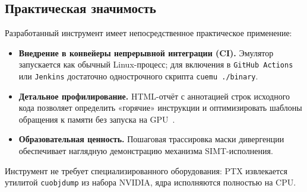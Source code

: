 \subsection{Практическая значимость}

Разработанный инструмент имеет непосредственное практическое применение:

\begin{itemize}
  \item \textbf{Внедрение в конвейеры непрерывной интеграции (CI).}
        Эмулятор запускается как обычный Linux-процесс; для включения
        в \texttt{GitHub Actions} или \texttt{Jenkins} достаточно
        однострочного скрипта \texttt{cuemu ./binary}.
  \item \textbf{Детальное профилирование.} HTML-отчёт с аннотацией
        строк исходного кода позволяет определить «горячие» инструкции
        и оптимизировать шаблоны обращения к памяти без запуска на GPU~\cite{Meerov2009}.
  \item \textbf{Образовательная ценность.} Пошаговая трассировка
        маски дивергенции обеспечивает наглядную демонстрацию
        механизма SIMT-исполнения.
\end{itemize}

Инструмент не требует специализированного оборудования: PTX извлекается утилитой \texttt{cuobjdump} из набора NVIDIA, ядра исполняются полностью на CPU.

\newpage
